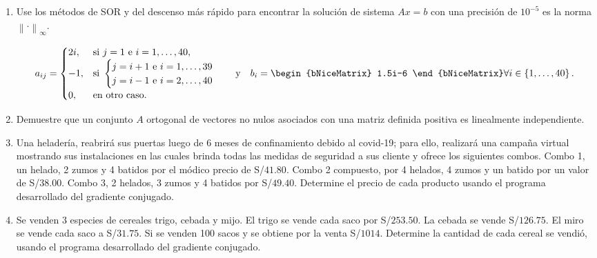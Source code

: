 \documentclass[
	spanish,
	8pt,
	utf8,
	xcolor=table,
	handout,
	aspectratio=169,
	professionalfonts,
	notheorems,
	mathserif,
]{beamer}
\begin{document}
\begin{frame}
\begin{enumerate}
		\item

		      Use los métodos de SOR y del descenso más rápido para
		      encontrar la solución de sistema $Ax=b$ con una precisión
		      de $10^{-5}$ es la norma ${\left\|\cdot\right\|}_{\infty}$.


		      \begin{equation*}
			      a_{ij}=
			      \begin{cases}
				      2i, & \text {si }j=1\text { e }i=1,\ldots,40, \\
				      -1, & \text {si }
				      \begin{cases}
					      j=i+1 \text { e } i=1,\ldots,39 \\
					      j=i-1 \text { e } i=2,\ldots,40
				      \end{cases}               \\
				      0,  & \text {en otro caso}.
			      \end{cases}\quad
			      \text{y}\quad
			      b_{i}=
			      \begin{bNiceMatrix}
				      1.5i-6
			      \end{bNiceMatrix}
			      \forall i\in\left\{1,\ldots,40\right\}.
		      \end{equation*}

		\item

		      Demuestre que un conjunto $A$ ortogonal de vectores no
		      nulos asociados con una matriz definida positiva es
		      linealmente independiente.

		\item


		      Una heladería, reabrirá sus puertas luego de $6$ meses de
		      confinamiento debido al covid-19; para ello, realizará una
		      campaña virtual mostrando sus instalaciones en las cuales
		      brinda todas las medidas de seguridad a sus cliente y
		      ofrece los siguientes combos.
		      Combo 1, un helado, 2 zumos y 4 batidos por el módico
		      precio de S/$41.80$.
		      Combo 2 compuesto, por 4 helados, 4 zumos y un batido por
		      un valor de S/$38.00$.
		      Combo 3, 2 helados, 3 zumos y 4 batidos por S/$49.40$.
		      Determine el precio de cada producto usando el programa
		      desarrollado del gradiente conjugado.

		\item

		      Se venden 3 especies de cereales trigo, cebada y mijo.
		      El trigo se vende cada saco por S/$253.50$.
		      La cebada se vende S/$126.75$.
		      El miro se vende cada saco a S/$31.75$.
		      Si se venden 100 sacos y se obtiene por la venta
		      S/$1014$.
		      Determine la cantidad de cada cereal se vendió, usando el
		      programa desarrollado del gradiente conjugado.


\end{enumerate}
\end{frame}
\end{document}
